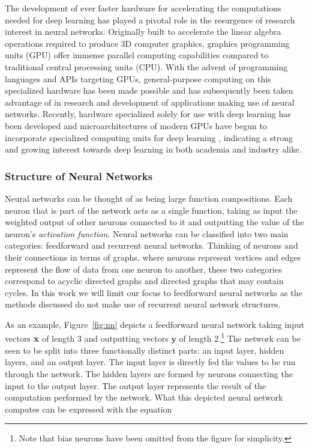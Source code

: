 The development of ever faster hardware for accelerating the computations needed for deep learning has played a pivotal role in the resurgence of research interest in neural networks. Originally built to accelerate the linear algebra operations required to produce 3D computer graphics, graphics programming units (GPU) offer immense parallel computing capabilities compared to traditional central processing units (CPU). With the advent of programming languages and APIs targeting GPUs, general-purpose computing on this specialized hardware has been made possible and has subsequently been taken advantage of in research and development of applications making use of neural networks. Recently, hardware specialized solely for use with deep learning has been developed \cite{tpu} and microarchitectures of modern GPUs have begun to incorporate specialized computing units for deep learning \cite{nvidia_tensor_core}, indicating a strong and growing interest towards deep learning in both academia and industry alike.

\subsubsection{Structure of Neural Networks}

Neural networks can be thought of as being large function compositions. Each neuron that is part of the network acts as a single function, taking as input the weighted output of other neurons connected to it and outputting the value of the neuron's \textit{activation function}. Neural networks can be classified into two main categories: feedforward and recurrent neural networks. Thinking of neurons and their connections in terms of graphs, where neurons represent vertices and edges represent the flow of data from one neuron to another, these two categories correspond to acyclic directed graphs and directed graphs that may contain cycles. In this work we will limit our focus to feedforward neural networks as the methods discussed do not make use of recurrent neural network structures.

As an example, Figure~\ref{fig:nn} depicts a feedforward neural network taking input vectors $\mathbf{x}$ of length $3$ and outputting vectors $\mathbf{y}$ of length $2$.\footnote{Note that bias neurons have been omitted from the figure for simplicity.} The network can be seen to be split into three functionally distinct parts: an input layer, hidden layers, and an output layer. The input layer is directly fed the values to be run through the network. The hidden layers are formed by neurons connecting the input to the output layer. The output layer represents the result of the computation performed by the network. What this depicted neural network computes can be expressed with the equation

